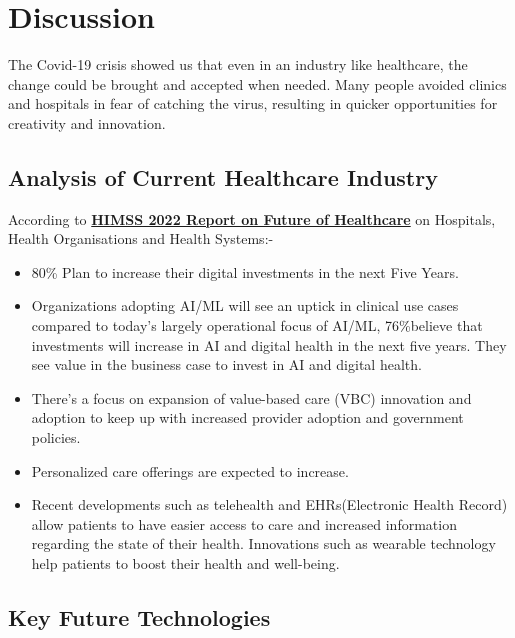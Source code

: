 \documentclass[12pt]{article}
\begin{document}
\section{Discussion}
The Covid-19 crisis showed us that even in an industry like healthcare, the change could be brought and accepted when needed. Many people avoided clinics and hospitals in fear of catching the virus, resulting in quicker opportunities for creativity and innovation.\\

\subsection{Analysis of Current Healthcare Industry}

According to \textbf{\href{https://www.himss.org/resources/future-healthcare-report-presentation}{HIMSS 2022 Report on Future of Healthcare}} on Hospitals, Health Organisations and Health Systems:-
\begin{itemize}

\item[\ding{234}] 80\% Plan to increase their digital investments in the next Five Years.

\item[\ding{234}] Organizations adopting AI/ML will see an uptick in clinical use cases compared to today's largely operational focus of AI/ML, 76\%believe that investments will increase in AI and digital health in the next five years. They see value in the business case to invest in AI and digital health.

\item[\ding{234}] There's a focus on expansion of value-based care (VBC) innovation and adoption to keep up with increased provider adoption and government policies.

\item[\ding{234}] Personalized care offerings are expected to increase.

\item[\ding{234}] Recent developments such as telehealth and EHRs(Electronic Health Record) allow patients to have easier access to care and increased information regarding the state of their health. Innovations such as wearable technology help patients to boost their health and well-being.

\end{itemize}


\subsection{Key Future Technologies}
\vspace{5mm}
\end{document}
